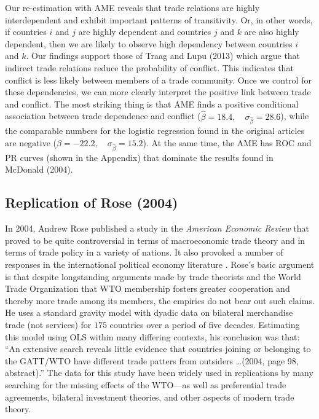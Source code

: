 Our re-estimation with AME reveals that trade relations are highly interdependent and exhibit important patterns of transitivity.  Or, in other words, if countries $i$ and $j$ are highly dependent and countries $j$ and $k$ are also highly dependent, then we are likely to observe high dependency between countries $i$ and $k$. Our findings support those of Traag and Lupu (2013) which argue that indirect trade relations reduce the probability of conflict. This indicates that conflict is less likely between members of a trade community. Once we control for these dependencies, we can more clearly interpret the positive link between trade and conflict.  The most striking thing is that AME finds a positive conditional association between trade dependence and conflict ($\hat{\beta}= 18.4, \quad \sigma_{\hat{\beta}} = 28.6$), while the comparable numbers for the logistic regression found in the original articles are negative ($\hat{\beta}= -22.2, \quad \sigma_{\hat{\beta}} = 15.2$). At the same time, the AME has ROC and PR curves (shown in the Appendix) that dominate the results found in McDonald (2004).

\subsection{Replication of Rose (2004)}

In 2004, Andrew Rose published a study in the \textit{American Economic Review} \nocite{rose:2004} that proved to be quite controversial in terms of macroeconomic trade theory and in terms of trade policy in a variety of nations. It also provoked a number of responses in the international political economy literature \cite{tomz:etal:2007,ward:etal:2013}.  Rose's basic argument is that despite longstanding arguments made by trade theorists and the World Trade Organization that WTO membership fosters greater cooperation and thereby more trade among its members, the empirics do not bear out such claims. He uses a standard gravity model with dyadic data on bilateral merchandise trade (not services) for $175$ countries over a period of five decades. Estimating this model using OLS within many differing contexts, his conclusion was that: ``An extensive search reveals little evidence that countries joining or belonging to the GATT/WTO have different trade patters from outsiders \ldots (2004, page 98, abstract).''  The data for this study have been widely used in replications by many searching for the missing effects of the WTO---as well as preferential trade agreements, bilateral investment theories, and other aspects of modern trade theory.  

